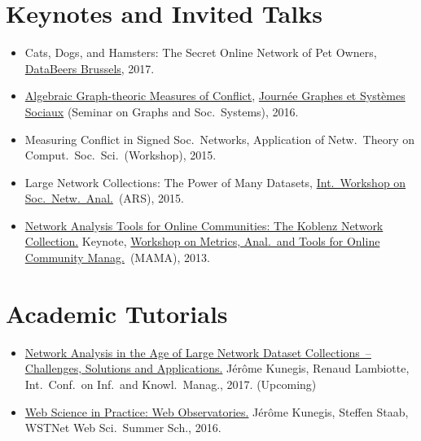 \documentclass[line,mm]{res}
\newcounter{x}
\newcounter{y}
\newcommand{\talknumber}{T\arabic{y}\stepcounter{y}}
\begin{document}
\begin{resume}
\section{Keynotes and Invited Talks}
\begin{itemize}
\item[{[\talknumber]}]
  Cats, Dogs, and Hamsters:  The Secret Online Network of Pet Owners,
  \href{http://databeers.brussels/}{DataBeers Brussels}, 2017.   
\item[{[\talknumber]}] 
  \href{https://www.slideshare.net/kunegis/algebraic-graphtheoretic-measures-of-conflict}{Algebraic Graph-theoric Measures of Conflict}, 
  \href{http://jgss.sciencesconf.org/}{Journée Graphes et Systèmes
    Sociaux} (Seminar on Graphs and Soc.\ Systems), 2016.  
\item[{[\talknumber]}] Measuring Conflict in Signed Soc.\ Networks, 
  Application of Netw.\ Theory on Comput.\ Soc.\ Sci.\ (Workshop), 2015.
\item[{[\talknumber]}] 
  Large Network Collections:  The Power of Many Datasets,
  \href{http://www.ars15.unisa.it/}{Int.\ Workshop on Soc.\ Netw.\ Anal.}\ (ARS), 2015. 
\item[{[\talknumber]}] 
  \href{https://github.com/kunegis/pdfs/blob/master/kunegis:konect-mama.presentation.pdf}{Network
    Analysis Tools for Online Communities: The Koblenz Network 
    Collection.} Keynote, \href{http://mama.west.uni-koblenz.de/}{Workshop
    on Metrics, Anal.\ and Tools for Online Community Manag.}\ (MAMA), 2013.  
\end{itemize}

\section{Academic Tutorials}
\begin{itemize}
  \item[{[\talknumber]}]
    \href{http://xn.unamur.be/network-collection-tutorial-cikm2017/}{Network Analysis in the Age of Large Network Dataset Collections~--
    Challenges, Solutions and Applications.}
    Jérôme Kunegis, Renaud Lambiotte, Int.\ Conf.\ on Inf.\ and Knowl.\ Manag., 2017.  (Upcoming)
  \item[{[\talknumber]}] 
    \href{https://github.com/kunegis/pdfs/blob/master/kunegis:web-observatories.presentation.pdf}{Web Science in Practice:  Web Observatories.}  
    Jérôme Kunegis, Steffen Staab, WSTNet Web Sci.\ Summer Sch., 2016.  
\end{itemize}


\end{resume}
\end{document}
